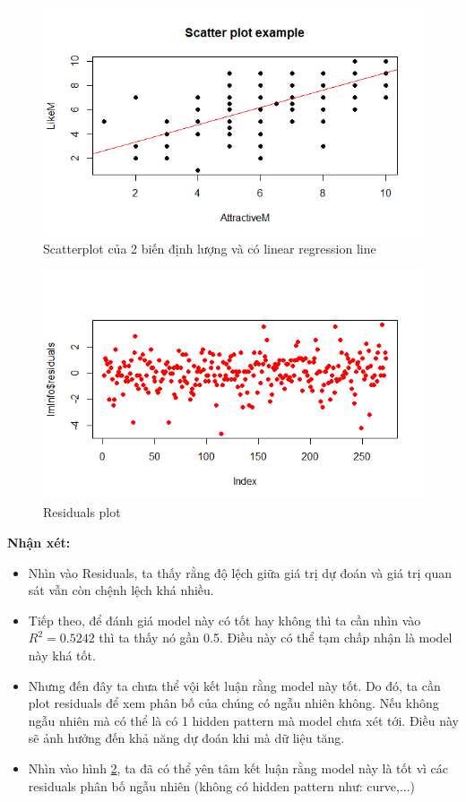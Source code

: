 \documentclass[a4paper,12pt]{article}
\begin{document}
	\begin{figure}[H]
		\centering
		\includegraphics[width=0.7\linewidth]{Rplot6}
		\caption{Scatterplot của 2 biến định lượng và có linear regression line}
		\label{fig:rplot6}
	\end{figure}
	
	\begin{figure}[H]
		\centering
		\includegraphics[width=0.7\linewidth]{Rplot7}
		\caption{Residuals plot}
		\label{fig:rplot7}
	\end{figure}
	
	\textbf{Nhận xét:}
	\begin{itemize}
		\item Nhìn vào Residuals, ta thấy rằng độ lệch giữa giá trị dự đoán và giá trị quan sát vẫn còn chệnh lệch khá nhiều.
		\item Tiếp theo, để đánh giá model này có tốt hay không thì ta cần nhìn vào $R^2 = 0.5242$ thì ta thấy nó gần 0.5. Điều này có thể tạm chấp nhận là model này khá tốt.
		\item Nhưng đến đây ta chưa thể vội kết luận rằng model này tốt. Do đó, ta cần plot residuals để xem phân bố của chúng có ngẫu nhiên không. Nếu không ngẫu nhiên mà có thể là có 1 hidden pattern mà model chưa xét tới. Điều này sẽ ảnh hưởng đến khả năng dự đoán khi mà dữ liệu tăng.
		\item Nhìn vào hình \ref{fig:rplot7}, ta đã có thể yên tâm kết luận rằng model này là tốt vì các residuals phân bố ngẫu nhiên (không có hidden pattern như: curve,...)
	\end{itemize}
	
\end{document}
